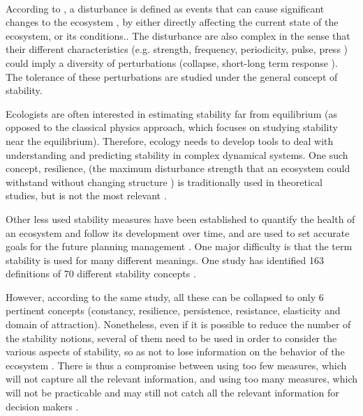 \documentclass{article}
\begin{document}
\paragraph{} %
According to \cite{rykiel_towards_1985}, a disturbance is defined  as events that can cause significant changes to the ecosystem \citep{white1985natural, rykiel_towards_1985}, by either directly affecting the current state of the ecosystem, or its conditions.. The disturbance are also complex in the sense that their different characteristics (e.g. strength, frequency, periodicity, pulse, press \citep{bender1984perturbation}) could imply a diversity of perturbations (collapse, short-long term response \citep{arnoldi2018ecosystems}). The tolerance of these perturbations are studied under the general concept of stability.

\label{stability_litterature}
Ecologists are often interested in estimating stability far from equilibrium (as opposed to the classical physics approach, which focuses on studying stability near the equilibrium). Therefore, ecology needs to develop tools to deal with understanding and predicting stability in complex dynamical systems. 
One such concept, resilience, (the maximum disturbance strength that an ecosystem could withstand without changing structure \citep{holling_resilience_1973}) is traditionally used in theoretical studies, but is not the most relevant %
\citep{gunderson_ecological_2000, neubert_alternatives_1997}.

Other less used stability measures have been established to quantify the health of an ecosystem and follow its development over time, and are used to set accurate goals for the future planning management \citep {donohue_navigating_2016, mayer_strengths_2008}. One major difficulty is that the term stability is used for many different meanings. One study has identified 163 definitions of 70 different stability concepts \citep{grimm_babel_1997}.

However, according to the same study, all these can be collapsed to only 6 pertinent concepts (constancy,  resilience,  persistence,  resistance,  elasticity and domain of attraction). Nonetheless, even if it is possible to reduce the number of the stability notions, several of them need to be used in order to consider the various aspects of stability, so as not to lose information on the behavior of the ecosystem \citep{derissen_relationship_2011}. There is thus a compromise between using too few measures, which will not capture all the relevant information, and using too many measures, which will not be practicable and may still not catch all the relevant information for decision makers \citep{hillebrand_decomposing_2018, donohue_dimensionality_2013}.
\end{document}
